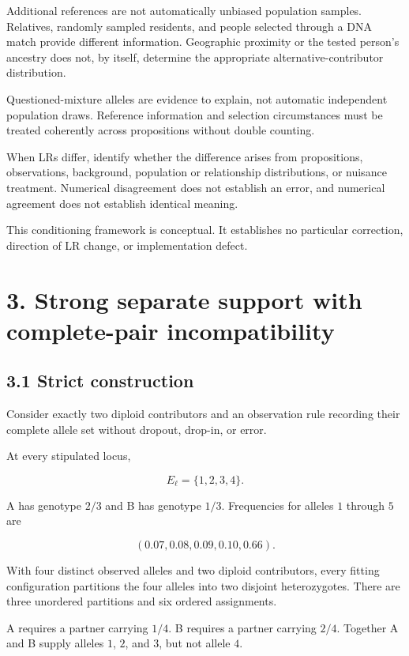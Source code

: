 \documentclass[
]{article}
\begin{document}
Additional references are not automatically unbiased population samples.
Relatives, randomly sampled residents, and people selected through a DNA
match provide different information. Geographic proximity or the tested
person's ancestry does not, by itself, determine the appropriate
alternative-contributor distribution.

Questioned-mixture alleles are evidence to explain, not automatic
independent population draws. Reference information and selection
circumstances must be treated coherently across propositions without
double counting.

When LRs differ, identify whether the difference arises from
propositions, observations, background, population or relationship
distributions, or nuisance treatment. Numerical disagreement does not
establish an error, and numerical agreement does not establish identical
meaning.

This conditioning framework is conceptual. It establishes no particular
correction, direction of LR change, or implementation defect.

\section{3. Strong separate support with complete-pair
incompatibility}\label{strong-separate-support-with-complete-pair-incompatibility}

\subsection{3.1 Strict construction}\label{strict-construction}

Consider exactly two diploid contributors and an observation rule
recording their complete allele set without dropout, drop-in, or error.

At every stipulated locus,

\[
E_\ell=\{1,2,3,4\}.
\]

A has genotype \(2/3\) and B has genotype \(1/3\). Frequencies for
alleles \(1\) through \(5\) are

\[
(0.07,0.08,0.09,0.10,0.66).
\]

With four distinct observed alleles and two diploid contributors, every
fitting configuration partitions the four alleles into two disjoint
heterozygotes. There are three unordered partitions and six ordered
assignments.

A requires a partner carrying \(1/4\). B requires a partner carrying
\(2/4\). Together A and B supply alleles \(1\), \(2\), and \(3\), but
not allele \(4\).
\end{document}
